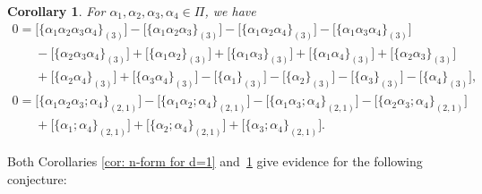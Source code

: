 \documentclass[10pt,a4paper]{amsart}
\numberwithin{equation}{section}
\newtheorem{Corollary}[Theorem]{Corollary}
\begin{document}
\begin{Corollary} \label{cor: n-form for d=2}
 For $\alpha_1,\alpha_2,\alpha_3,\alpha_4 \in \Pi$, we have
 \begin{gather*}
 0=\big[\{\alpha_1\alpha_2\alpha_3\alpha_4\}_{(3)} \big]-\big[\{\alpha_1\alpha_2\alpha_3\}_{(3)} \big]
 -\big[\{\alpha_1\alpha_2\alpha_4\}_{(3)} \big]
-\big[\{\alpha_1\alpha_3\alpha_4\}_{(3)} \big]\nonumber\\
 \phantom{0=}{}-\big[\{\alpha_2\alpha_3\alpha_4\}_{(3)} \big]
 +\big[\{\alpha_1\alpha_2\}_{(3)} \big]
+\big[\{\alpha_1\alpha_3\}_{(3)} \big]
 +\big[\{\alpha_1\alpha_4\}_{(3)} \big]
+\big[\{\alpha_2\alpha_3\}_{(3)} \big]\nonumber\\
\phantom{0=}{}+\big[\{\alpha_2\alpha_4\}_{(3)} \big]
 +\big[\{\alpha_3\alpha_4\}_{(3)} \big]
 -\big[\{\alpha_1\}_{(3)} \big]
-\big[\{\alpha_2\}_{(3)} \big]
 -\big[\{\alpha_3\}_{(3)} \big]
 -\big[\{\alpha_4\}_{(3)} \big],
 \\
 0=\big[\{\alpha_1\alpha_2\alpha_3;\alpha_4\}_{(2,1)}\big]-\big[\{\alpha_1\alpha_2;\alpha_4\}_{(2,1)}\big]-\big[\{\alpha_1\alpha_3;\alpha_4\}_{(2,1)}\big]-\big[\{\alpha_2\alpha_3;\alpha_4\}_{(2,1)}\big]\nonumber\\
 \phantom{0=}{}+\big[\{\alpha_1;\alpha_4\}_{(2,1)}\big]+\big[\{\alpha_2;\alpha_4\}_{(2,1)}\big]+\big[\{\alpha_3;\alpha_4\}_{(2,1)}\big].
 \end{gather*}
\end{Corollary}

Both Corollaries \ref{cor: n-form for d=1} and~\ref{cor: n-form for d=2} give evidence for the following conjecture:
\end{document}
